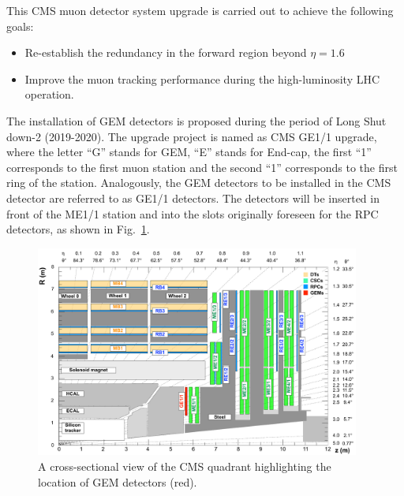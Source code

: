 This CMS muon detector system upgrade is carried out to achieve the following goals:
\begin{itemize}
    \item Re-establish the redundancy in the forward region beyond $\eta = 1.6$
    \item Improve the muon tracking performance during the high-luminosity LHC operation.
\end{itemize}
The installation of GEM detectors is proposed during the period of Long Shut down-2 (2019-2020).
The upgrade project is named as CMS GE1/1 upgrade, where the letter ``G'' stands for GEM, ``E'' stands for End-cap, the first ``1'' corresponds to the first muon station and the second ``1'' corresponds to the first ring of the station.
Analogously, the GEM detectors to be installed in the CMS detector are referred to as GE1/1 detectors.
The detectors will be inserted in front of the ME1/1 station and into the slots originally foreseen for the RPC detectors, as shown in Fig.~\ref{fig:GE1/1pos}. 
\begin{figure}[!htbp]
    \centering
    \includegraphics[width=0.95\textwidth]{figures/GEM/cms_upg_o_g_b_ni_ge1_r_140227.pdf}
    \caption{A cross-sectional view of the CMS quadrant highlighting the location of GEM detectors (red).}
    \label{fig:GE1/1pos}
\end{figure}

